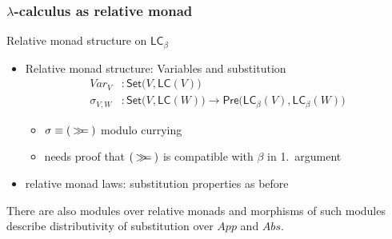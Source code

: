 \documentclass[
serif,
mathsans,
]
{beamer}
\newcommand{\bind}[2]{{#1}\mathbin{\gg\hspace{-.8ex}=}{#2}}
\newcommand{\LC}{\mathsf{LC}}
\newcommand{\Set}{\mathsf{Set}}
\newcommand{\PreOrd}{\mathsf{Pre}}
\begin{document}
\begin{frame}
\frametitle{$\lambda$-calculus as relative monad}

 
 
 
     
   
    
  \begin{block}{Relative monad structure on $\LC_\beta$}  
    
   \begin{itemize} 
    
   \item Relative monad structure: Variables and substitution
        \begin{align*} Var_{V} &: \Set\bigl(V, \LC(V)\bigr) \\
                       \sigma_{V,W} &: \Set\bigl(V, \LC(W)\bigr) \to \PreOrd\bigl(\LC_\beta(V),\LC_\beta(W)\bigr)
        \end{align*}
  
  \vspace{-.7em}
     \begin{itemize}
         \item   $\sigma \equiv (\bind{}{})$ modulo currying
         \item needs proof that $(\bind{}{})$ is compatible with $\beta$ in 1.\ argument
    \end{itemize}
    
  \item relative monad laws: substitution properties as before 
    
 \end{itemize}
 
 \end{block}
 
 \begin{block}{There are also modules over relative monads}
    and morphisms of such modules describe distributivity of substitution over $App$ and $Abs$.
 \end{block}

\end{frame}
\end{document}
